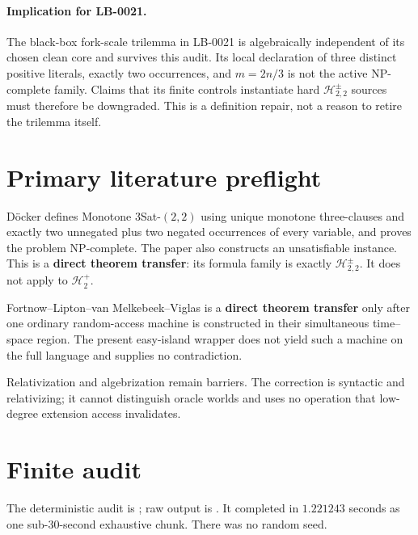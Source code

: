 \documentclass[11pt]{article}
\newcommand{\Hplus}{\mathcal H^{+}_{2}}
\newcommand{\Hsigned}{\mathcal H^{\pm}_{2,2}}
\begin{document}
\paragraph{Implication for LB-0021.}
The black-box fork-scale trilemma in LB-0021 is algebraically independent
of its chosen clean core and survives this audit.  Its local declaration
of three distinct positive literals, exactly two occurrences, and
$m=2n/3$ is not the active NP-complete family.  Claims that its finite
controls instantiate hard $\Hsigned$ sources must therefore be downgraded.
This is a definition repair, not a reason to retire the trilemma itself.

\section{Primary literature preflight}

D\"ocker defines Monotone $3$Sat-$(2,2)$ using unique monotone
three-clauses and exactly two unnegated plus two negated occurrences of
every variable, and proves the problem NP-complete.  The paper also
constructs an unsatisfiable instance.  This is a \textbf{direct theorem
transfer}: its formula family is exactly $\Hsigned$.  It does not apply to
$\Hplus$.

Fortnow--Lipton--van Melkebeek--Viglas is a \textbf{direct theorem
transfer} only after one ordinary random-access machine is constructed in
their simultaneous time--space region.  The present easy-island wrapper
does not yield such a machine on the full language and supplies no
contradiction.

Relativization and algebrization remain barriers.  The correction is
syntactic and relativizing; it cannot distinguish oracle worlds and uses no
operation that low-degree extension access invalidates.

\section{Finite audit}

The deterministic audit is
; raw output
is
.
It completed in $1.221243$ seconds as one sub-30-second exhaustive chunk.
There was no random seed.
\end{document}
